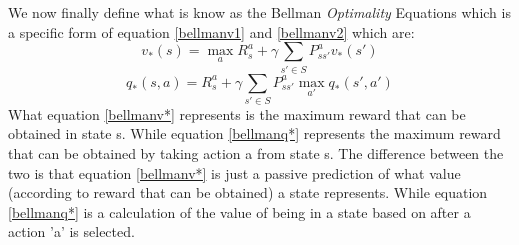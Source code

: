 We now finally define what is know as the Bellman \textit{Optimality} Equations which is a specific form of equation \ref{bellmanv1} and \ref{bellmanv2} which are:
\begin{equation}
	v_*(s) = \max\limits_{a}R^{a}_s+\gamma\sum_{s'\in S}P^{a}_{ss'}v_*(s')
	\label{bellmanv*}
\end{equation}
\begin{equation}
	q_*(s,a) = R^{a}_s +\gamma \sum_{s'\in S}P^{a}_{ss'}\max\limits_{a'}q_*(s',a')
	\label{bellmanq*}
\end{equation}
What equation \ref{bellmanv*} represents is the maximum reward that can be obtained in state s. While equation \ref{bellmanq*} represents the maximum reward that can be obtained by taking action a from state s. The difference between the two is that equation \ref{bellmanv*} is just a passive prediction of what value (according to reward that can be obtained) a state represents. While equation \ref{bellmanq*} is a calculation of the value of being in a state based on after a action 'a' is selected.

